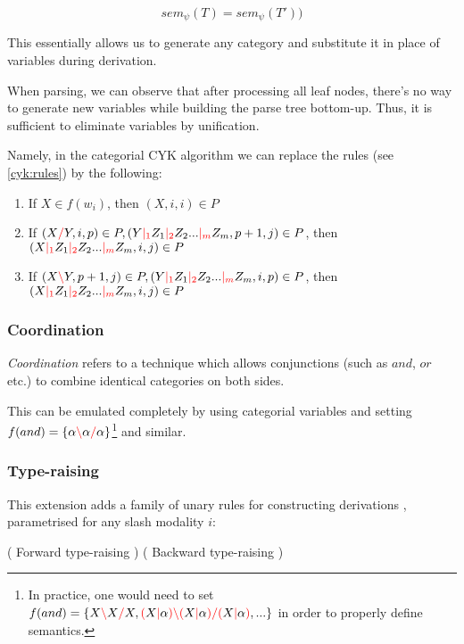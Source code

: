 \documentclass[main.tex]{subfiles}
\begin{document}
\[ sem_{\psi}(T) = sem_{\psi}(T')) \]

This essentially allows us to generate any category and substitute it in place
of variables during derivation.

When parsing, we can observe that after processing all leaf nodes,
there's no way to generate new variables while building the parse tree
bottom-up. Thus, it is sufficient to eliminate variables by unification.

Namely, in the categorial CYK algorithm we can replace the rules (see \cref{cyk:rules})
by the following:

\begin{enumerate}
    \item If $X \in f(w_i)$, then $(X, i, i) \in P$
    \item If $(X \textcolor{red}{/} Y, i, p) \in P, (Y \textcolor{red}{|_{1}} Z_1 \textcolor{red}{|_{2}} Z_2 ... \textcolor{red}{|_{m}} Z_m, p + 1, j) \in P$,
        then $(X \textcolor{red}{|_{1}} Z_1 \textcolor{red}{|_{2}} Z_2 ... \textcolor{red}{|_{m}} Z_m, i, j) \in P$
    \item If $(X \textcolor{red}{\backslash} Y, p + 1, j) \in P, (Y \textcolor{red}{|_{1}} Z_1 \textcolor{red}{|_{2}} Z_2 ... \textcolor{red}{|_{m}} Z_m, i, p) \in P$,
        then $(X \textcolor{red}{|_{1}} Z_1 \textcolor{red}{|_{2}} Z_2 ... \textcolor{red}{|_{m}} Z_m, i, j) \in P$
\end{enumerate}

\subsubsection{Coordination}
\emph{Coordination} refers to a technique which allows conjunctions (such as
$and$, $or$ etc.) to combine identical categories on both sides.

This can be emulated completely by using categorial variables and setting
$f(and) = \{ \alpha \textcolor{red}{\backslash} \alpha \textcolor{red}{/} \alpha \}$\footnote{
    In practice, one would need to set
    $f(and) = \{ X \textcolor{red}{\backslash} X \textcolor{red}{/} X, \textcolor{red}{(} X \textcolor{red}{|} \alpha \textcolor{red}{)} \textcolor{red}{\backslash} \textcolor{red}{(} X \textcolor{red}{|} \alpha \textcolor{red}{)} \textcolor{red}{/} \textcolor{red}{(} X \textcolor{red}{|} \alpha \textcolor{red}{)}, ...\}$
    in order to properly define semantics.
} and similar.

\subsubsection{Type-raising}
This extension adds a family of unary rules for constructing derivations \cite[sec.~5.3.1]{nts},
parametrised for any slash modality $i$:
\begin{center}
        ( Forward type-raising )
        ( Backward type-raising )
\end{center}
\end{document}
